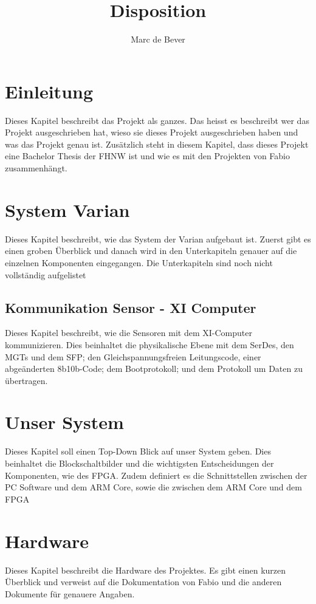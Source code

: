 \documentclass{article}
\title{Disposition}
\author{Marc de Bever}
\begin{document}
\maketitle
\section{Einleitung}
Dieses Kapitel beschreibt das Projekt als ganzes. Das heisst es beschreibt wer das Projekt ausgeschrieben hat, wieso sie dieses Projekt ausgeschrieben haben und was das Projekt genau ist. Zusätzlich steht in diesem Kapitel, dass dieses Projekt eine Bachelor Thesis der FHNW ist und wie es mit den Projekten von Fabio zusammenhängt.

\section{System Varian}
Dieses Kapitel beschreibt, wie das System der Varian aufgebaut ist. Zuerst gibt es einen groben Überblick und danach wird in den Unterkapiteln genauer auf die einzelnen Komponenten eingegangen. Die Unterkapiteln sind noch nicht vollständig aufgelistet
\subsection{Kommunikation Sensor - XI Computer}
Dieses Kapitel beschreibt, wie die Sensoren mit dem XI-Computer kommunizieren. Dies beinhaltet die physikalische Ebene mit dem SerDes, den MGTs und dem SFP; den Gleichspannungsfreien Leitungscode, einer abgeänderten 8b10b-Code; dem Bootprotokoll; und dem Protokoll um Daten zu übertragen.

\section{Unser System}
Dieses Kapitel soll einen Top-Down Blick auf unser System geben. Dies beinhaltet die Blockschaltbilder und die wichtigsten Entscheidungen der Komponenten, wie des FPGA. Zudem definiert es die Schnittstellen zwischen der PC Software und dem ARM Core, sowie die zwischen dem ARM Core und dem FPGA

\section{Hardware}
Dieses Kapitel beschreibt die Hardware des Projektes. Es gibt einen kurzen Überblick und verweist auf die Dokumentation von Fabio und die anderen Dokumente für genauere Angaben.
\end{document}
